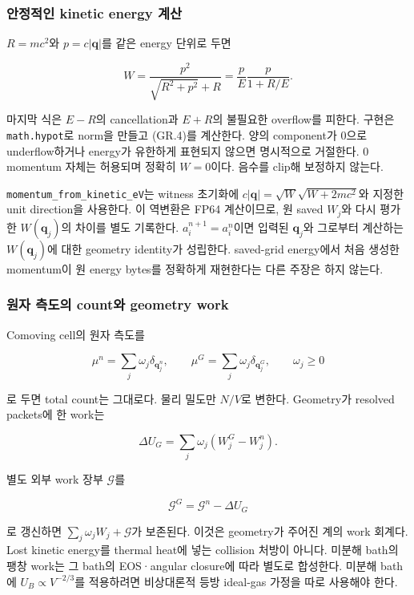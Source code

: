 \hypertarget{uxc548uxc815uxc801uxc778-kinetic-energy-uxacc4uxc0b0}{%
\subsubsection{안정적인 kinetic energy 계산}\label{uxc548uxc815uxc801uxc778-kinetic-energy-uxacc4uxc0b0}}

\(R=mc^2\)와 \(p=c|\mathbf q|\)를 같은 energy 단위로 두면

\[
 W=\frac{p^2}{\sqrt{R^2+p^2}+R}
   =\frac{p}{E}\frac{p}{1+R/E}.
\tag{GR.4}
\]

마지막 식은 \(E-R\)의 cancellation과 \(E+R\)의 불필요한 overflow를 피한다. 구현은 \texttt{math.hypot}로 norm을 만들고 (GR.4)를 계산한다. 양의 component가 0으로 underflow하거나 energy가 유한하게 표현되지 않으면 명시적으로 거절한다. 0 momentum 자체는 허용되며 정확히 \(W=0\)이다. 음수를 clip해 보정하지 않는다.

\texttt{momentum\_from\_kinetic\_eV}는 witness 초기화에 \(c|\mathbf q|=\sqrt W\sqrt{W+2mc^2}\)와 지정한 unit direction을 사용한다. 이 역변환은 FP64 계산이므로, 원 saved \(W_j\)와 다시 평가한 \(W(\mathbf q_j)\)의 차이를 별도 기록한다. \(a_i^{n+1}=a_i^n\)이면 입력된 \(\mathbf q_j\)와 그로부터 계산하는 \(W(\mathbf q_j)\)에 대한 geometry identity가 성립한다. saved-grid energy에서 처음 생성한 momentum이 원 energy bytes를 정확하게 재현한다는 다른 주장은 하지 않는다.

\hypertarget{uxc6d0uxc790-uxce21uxb3c4uxc758-countuxc640-geometry-work}{%
\subsubsection{원자 측도의 count와 geometry work}\label{uxc6d0uxc790-uxce21uxb3c4uxc758-countuxc640-geometry-work}}

Comoving cell의 원자 측도를

\[
 \mu^n=\sum_j\omega_j\delta_{\mathbf q_j^n},\qquad
 \mu^G=\sum_j\omega_j\delta_{\mathbf q_j^G},\qquad\omega_j\ge0
\tag{GR.5}
\]

로 두면 total count는 그대로다. 물리 밀도만 \(N/V\)로 변한다. Geometry가 resolved packets에 한 work는

\[
 \Delta U_G=\sum_j\omega_j(W_j^G-W_j^n).
\tag{GR.6}
\]

별도 외부 work 장부 \(\mathcal G\)를

\[
 \mathcal G^G=\mathcal G^n-\Delta U_G
\tag{GR.7}
\]

로 갱신하면 \(\sum_j\omega_jW_j+\mathcal G\)가 보존된다. 이것은 geometry가 주어진 계의 work 회계다. Lost kinetic energy를 thermal heat에 넣는 collision 처방이 아니다. 미분해 bath의 팽창 work는 그 bath의 EOS·angular closure에 따라 별도로 합성한다. 미분해 bath에 \(U_B\propto V^{-2/3}\)를 적용하려면 비상대론적 등방 ideal-gas 가정을 따로 사용해야 한다.

